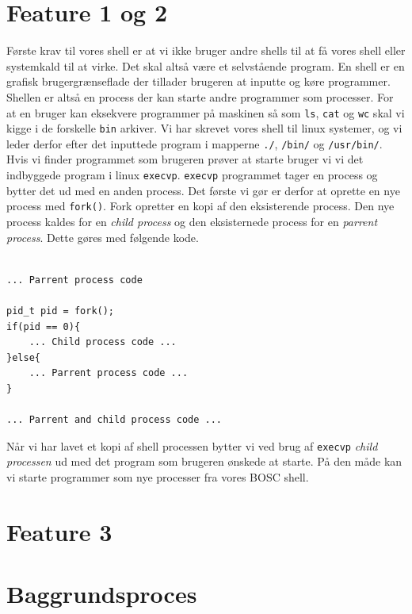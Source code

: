 \documentclass[danish]{report}
\begin{document}
\section{Feature 1 og 2}
Første krav til vores shell er at vi ikke bruger andre shells til at få vores shell eller systemkald til at virke. Det skal altså være et selvstående program. En shell er en grafisk brugergrænseflade der tillader brugeren at inputte og køre programmer. Shellen er altså en process der kan starte andre programmer som processer. For at en bruger kan eksekvere programmer på maskinen så som {\tt ls}, {\tt cat} og {\tt wc} skal vi kigge i de forskelle {\tt bin} arkiver. Vi har skrevet vores shell til linux systemer, og vi leder derfor efter det inputtede program i mapperne {\tt ./}, {\tt /bin/} og {\tt /usr/bin/}. Hvis vi finder programmet som brugeren prøver at starte bruger vi vi det indbyggede program i linux {\tt execvp}. {\tt execvp} programmet tager en process og bytter det ud med en anden process. Det første vi gør er derfor at oprette en nye process med {\tt fork()}. Fork opretter en kopi af den eksisterende process. Den nye process kaldes for en \textit{child process} og den eksisternede process for en \textit{parrent process}. Dette gøres med følgende kode.

\begin{lstlisting}

... Parrent process code

pid_t pid = fork();
if(pid == 0){
    ... Child process code ...
}else{
    ... Parrent process code ...
}

... Parrent and child process code ...

\end{lstlisting}

Når vi har lavet et kopi af shell processen bytter vi ved brug af {\tt execvp} \textit{child processen} ud med det program som brugeren ønskede at starte. På den måde kan vi starte programmer som nye processer fra vores BOSC shell.

\section{Feature 3}
\section{Baggrundsproces}
\end{document}
